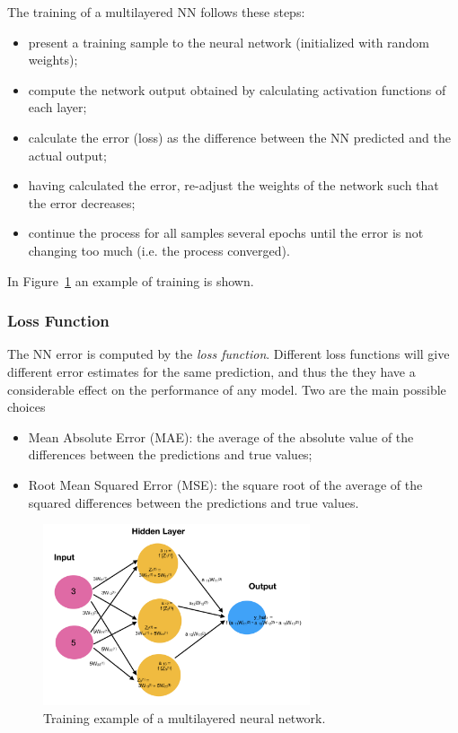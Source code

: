 The training of a multilayered NN follows these steps:

\begin{itemize}
	\tightlist
	\item
	present a training sample to the neural network (initialized with
	random weights);
	\item
	compute the network output obtained by calculating activation functions of each layer;
	\item
	calculate the error (loss) as the difference between the NN predicted
	and the actual output;
	\item
	having calculated the error, re-adjust the weights of the network such
	that the error decreases;
	\item
	continue the process for all samples several epochs until the
	error is not changing too much (i.e. the process converged).
\end{itemize}
In Figure~\ref{fig:training} an example of training is shown.

\subsubsection{Loss Function}
The NN error is computed by the \emph{loss function}. Different loss
functions will give different error estimates for the same prediction, and thus
the they have a considerable effect on the performance of any model. Two are the
main possible choices

\begin{itemize}
	\tightlist
	\item
	Mean Absolute Error (MAE): the average of the absolute value of the
	differences between the predictions and true values;
	\item
	Root Mean Squared Error (MSE): the square root of the average of the
	squared differences between the predictions and true values.
\end{itemize}

\begin{figure}[htb]
	\centering
	\includegraphics[width=0.7\textwidth]{figures/training_nn}
	\caption{Training example of a multilayered neural network.}
	\label{fig:training}
\end{figure}

